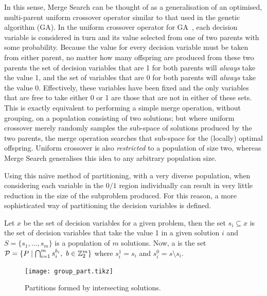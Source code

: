 \documentclass[journal]{IEEEtran}
\begin{document}
In this sense, Merge Search can be thought of as a generalisation of an optimised, multi-parent uniform crossover operator similar to that used in the genetic algorithm (GA). In the uniform crossover operator for GA~\cite{Luke2009}, each decision variable is considered in turn and its value selected from one of two parents with some probability. Because the value for every decision variable must be taken from either parent, no matter how many offspring are produced from these two parents the set of decision variables that are 1 for both parents will \emph{always} take the value 1, and the set of variables that are 0 for both parents will \emph{always} take the value 0. Effectively, these variables have been fixed and the only variables that are free to take either 0 or 1 are those that are not in either of these sets. This is exactly equivalent to performing a simple merge operation, without grouping, on a population consisting of two solutions; but where uniform crossover merely randomly samples the sub-space of solutions produced by the two parents, the merge operation searches that sub-space for the (locally) optimal offspring. Uniform crossover is also \emph{restricted} to a population of size two, whereas Merge Search generalises this idea to any arbitrary population size.

Using this na{\"\i}ve method of partitioning, with a very diverse population, when considering each variable in the $0/1$ region individually can result in very little reduction in the size of the subproblem produced. For this reason, a more sophisticated way of partitioning the decision variables is defined.

\begin{definition}\label{prop:part}
Let $x$ be the set of decision variables for a given problem, then the set $s_i \subseteq x$ is the set of decision variables that take the value 1 in a given solution $i$ and $S = \{s_1,\dots,s_m\}$ is a population of $m$ solutions. Now, a  is the set ${\cal P} = \{P \mid \bigcap_{i=1}^{m} s^{b_i}_i,\ b \in \Bin^m\}$ %
where $s_i^1 = s_i$ and $s_i^0 = s \setminus s_i$.
\end{definition}

\begin{figure}[h!]
\centering
\texttt{[image: group\_part.tikz]}
\caption[Partitions formed by intersecting solutions]{Partitions formed by intersecting solutions.}
\label{fig:group_part}
\end{figure}
\end{document}
